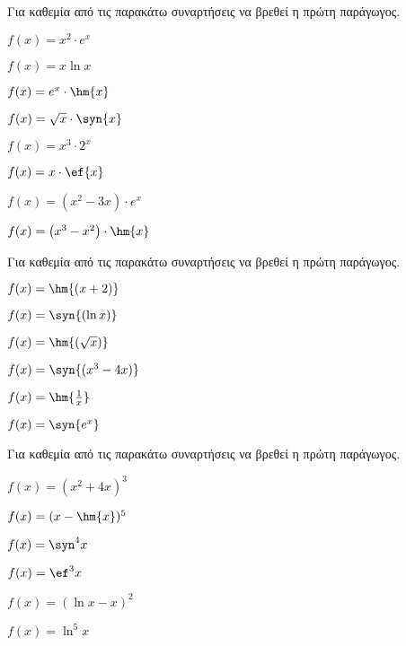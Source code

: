 Για καθεμία από τις παρακάτω συναρτήσεις να βρεθεί η πρώτη παράγωγος.
\begin{multicols}{2}
\begin{alist}
\item $ f(x)=x^2\cdot e^x $
\item $ f(x)=x\ln{x} $
\item $ f(x)=e^x\cdot\hm{x} $
\item $ f(x)=\sqrt{x}\cdot\syn{x} $
\item $ f(x)=x^3\cdot 2^x $
\item $ f(x)=x\cdot\ef{x} $
\item $ f(x)=\left(x^2-3x\right)\cdot e^x $
\item $ f(x)=\left(x^3-x^2\right)\cdot\hm{x} $
\end{alist}
\end{multicols}

Για καθεμία από τις παρακάτω συναρτήσεις να βρεθεί η πρώτη παράγωγος.
\begin{multicols}{2}
\begin{alist}
\item $ f(x)=\hm{(x+2)} $
\item $ f(x)=\syn{(\ln{x})} $
\item $ f(x)=\hm{(\sqrt{x})} $
\item $ f(x)=\syn{(x^3-4x)} $
\item $ f(x)=\hm{\frac{1}{x}} $
\item $ f(x)=\syn{e^x} $
\end{alist}
\end{multicols}

Για καθεμία από τις παρακάτω συναρτήσεις να βρεθεί η πρώτη παράγωγος.
\begin{multicols}{2}
\begin{alist}
\item $ f(x)=(x^2+4x)^3 $
\item $ f(x)=(x-\hm{x})^5 $
\item $ f(x)=\syn^4{x} $
\item $ f(x)=\ef^3{x} $
\item $ f(x)=(\ln{x}-x)^2 $
\item $ f(x)=\ln^5{x} $
\end{alist}
\end{multicols}

